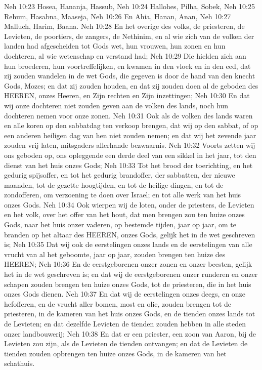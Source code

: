Neh 10:23  Hosea, Hananja, Hassub,
Neh 10:24  Hallohes, Pilha, Sobek,
Neh 10:25  Rehum, Hasabna, Maaseja,
Neh 10:26  En Ahia, Hanan, Anan,
Neh 10:27  Malluch, Harim, Baana.
Neh 10:28  En het overige des volks, de priesteren, de Levieten, de poortiers, de zangers, de Nethinim, en al wie zich van de volken der landen had afgescheiden tot Gods wet, hun vrouwen, hun zonen en hun dochteren, al wie wetenschap en verstand had;
Neh 10:29  Die hielden zich aan hun broederen, hun voortreffelijken, en kwamen in den vloek en in den eed, dat zij zouden wandelen in de wet Gods, die gegeven is door de hand van den knecht Gods, Mozes; en dat zij zouden houden, en dat zij zouden doen al de geboden des HEEREN, onzes Heeren, en Zijn rechten en Zijn inzettingen;
Neh 10:30  En dat wij onze dochteren niet zouden geven aan de volken des lands, noch hun dochteren nemen voor onze zonen.
Neh 10:31  Ook als de volken des lands waren en alle koren op den sabbatdag ten verkoop brengen, dat wij op den sabbat, of op een anderen heiligen dag van hen niet zouden nemen; en dat wij het zevende jaar zouden vrij laten, mitsgaders allerhande bezwaarnis.
Neh 10:32  Voorts zetten wij ons geboden op, ons opleggende een derde deel van een sikkel in het jaar, tot den dienst van het huis onzes Gods;
Neh 10:33  Tot het brood der toerichting, en het gedurig spijsoffer, en tot het gedurig brandoffer, der sabbatten, der nieuwe maanden, tot de gezette hoogtijden, en tot de heilige dingen, en tot de zondofferen, om verzoening te doen over Israel; en tot alle werk van het huis onzes Gods.
Neh 10:34  Ook wierpen wij de loten, onder de priesters, de Levieten en het volk, over het offer van het hout, dat men brengen zou ten huize onzes Gods, naar het huis onzer vaderen, op bestemde tijden, jaar op jaar, om te branden op het altaar des HEEREN, onzes Gods, gelijk het in de wet geschreven is;
Neh 10:35  Dat wij ook de eerstelingen onzes lands en de eerstelingen van alle vrucht van al het geboomte, jaar op jaar, zouden brengen ten huize des HEEREN;
Neh 10:36  En de eerstgeborenen onzer zonen en onzer beesten, gelijk het in de wet geschreven is; en dat wij de eerstgeborenen onzer runderen en onzer schapen zouden brengen ten huize onzes Gods, tot de priesteren, die in het huis onzes Gods dienen.
Neh 10:37  En dat wij de eerstelingen onzes deegs, en onze hefofferen, en de vrucht aller bomen, most en olie, zouden brengen tot de priesteren, in de kameren van het huis onzes Gods, en de tienden onzes lands tot de Levieten; en dat dezelfde Levieten de tienden zouden hebben in alle steden onzer landbouwerij;
Neh 10:38  En dat er een priester, een zoon van Aaron, bij de Levieten zou zijn, als de Levieten de tienden ontvangen; en dat de Levieten de tienden zouden opbrengen ten huize onzes Gods, in de kameren van het schathuis.
